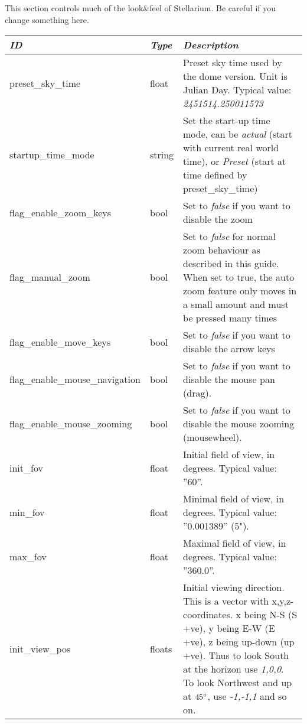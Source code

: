 This section controls much of the look\&feel of Stellarium. Be careful if you change something here.


\begin{longtable}{l|l|p{77mm}}\toprule
\emph{ID}              & \emph{Type} & \emph{Description}\\\midrule
preset\_sky\_time               & float  & Preset sky time used by the dome version. Unit is Julian Day. Typical value: \emph{2451514.250011573}\\%
startup\_time\_mode             & string & Set the start-up time mode, can be \emph{actual} (start with current real world time), 
                                           or \emph{Preset} (start at time defined by preset\_sky\_time)\\%
flag\_enable\_zoom\_keys        & bool   & Set to \emph{false} if you want to disable the zoom\\%
flag\_manual\_zoom              & bool   & Set to \emph{false} for normal zoom behaviour as described in this guide. 
                                           When set to true, the auto zoom feature only moves in a small amount and must be pressed many times\\%
flag\_enable\_move\_keys        & bool   & Set to \emph{false} if you want to disable the arrow keys\\%
flag\_enable\_mouse\_navigation & bool   & Set to \emph{false} if you want to disable the mouse pan (drag).\\%
flag\_enable\_mouse\_zooming & bool   & Set to \emph{false} if you want to disable the mouse zooming (mousewheel).\\%
init\_fov                       & float  & Initial field of view, in degrees. Typical value: ''60''.\\%
min\_fov                        & float  & Minimal field of view, in degrees. Typical value: ''0.001389'' (5").\\%
max\_fov                        & float  & Maximal field of view, in degrees. Typical value: ''360.0''.\\%
init\_view\_pos                 & floats & Initial viewing direction. This is a vector with x,y,z-coordinates. x being N-S (S +ve), 
                                           y being E-W (E +ve), z being up-down (up +ve). Thus to look South at the horizon use \emph{1,0,0}. 
                                           To look Northwest and up at $45\degree$, use \emph{-1,-1,1} and so on.\\%

\end{longtable}

